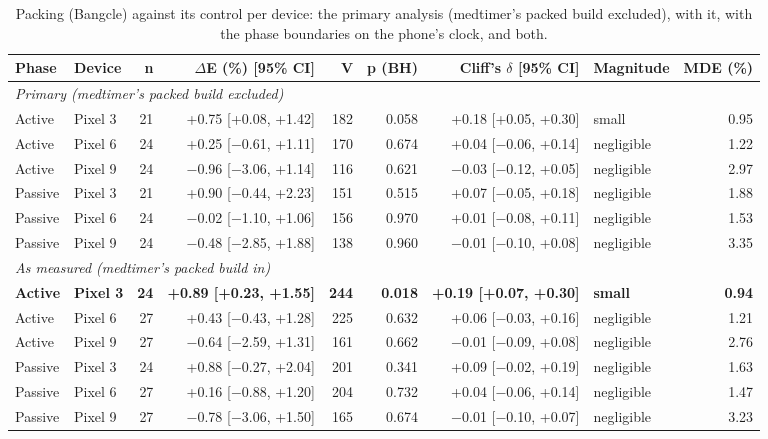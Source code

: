 \begin{table}[t]
\centering
\small
\caption{Packing (Bangcle) against its control per device: the primary analysis (medtimer's packed build excluded), with it, with the phase boundaries on the phone's clock, and both.}
\label{tab:packing-checks}
\begin{tabular}{llrrrrrlr}
\toprule
\textbf{Phase} & \textbf{Device} & \textbf{n} & \textbf{$\Delta$E (\%) [95\% CI]} & \textbf{V} & \textbf{p (BH)} & \textbf{Cliff's $\delta$ [95\% CI]} & \textbf{Magnitude} & \textbf{MDE (\%)} \\
\midrule
\multicolumn{9}{l}{\textit{Primary (medtimer's packed build excluded)}} \\
Active & Pixel 3 & 21 & +0.75 [+0.08, +1.42] & 182 & 0.058 & +0.18 [+0.05, +0.30] & small & 0.95 \\
Active & Pixel 6 & 24 & +0.25 [$-$0.61, +1.11] & 170 & 0.674 & +0.04 [$-$0.06, +0.14] & negligible & 1.22 \\
Active & Pixel 9 & 24 & $-$0.96 [$-$3.06, +1.14] & 116 & 0.621 & $-$0.03 [$-$0.12, +0.05] & negligible & 2.97 \\
Passive & Pixel 3 & 21 & +0.90 [$-$0.44, +2.23] & 151 & 0.515 & +0.07 [$-$0.05, +0.18] & negligible & 1.88 \\
Passive & Pixel 6 & 24 & $-$0.02 [$-$1.10, +1.06] & 156 & 0.970 & +0.01 [$-$0.08, +0.11] & negligible & 1.53 \\
Passive & Pixel 9 & 24 & $-$0.48 [$-$2.85, +1.88] & 138 & 0.960 & $-$0.01 [$-$0.10, +0.08] & negligible & 3.35 \\
\midrule
\multicolumn{9}{l}{\textit{As measured (medtimer's packed build in)}} \\
\textbf{Active} & \textbf{Pixel 3} & \textbf{24} & \textbf{+0.89 [+0.23, +1.55]} & \textbf{244} & \textbf{0.018} & \textbf{+0.19 [+0.07, +0.30]} & \textbf{small} & \textbf{0.94} \\
Active & Pixel 6 & 27 & +0.43 [$-$0.43, +1.28] & 225 & 0.632 & +0.06 [$-$0.03, +0.16] & negligible & 1.21 \\
Active & Pixel 9 & 27 & $-$0.64 [$-$2.59, +1.31] & 161 & 0.662 & $-$0.01 [$-$0.09, +0.08] & negligible & 2.76 \\
Passive & Pixel 3 & 24 & +0.88 [$-$0.27, +2.04] & 201 & 0.341 & +0.09 [$-$0.02, +0.19] & negligible & 1.63 \\
Passive & Pixel 6 & 27 & +0.16 [$-$0.88, +1.20] & 204 & 0.732 & +0.04 [$-$0.06, +0.14] & negligible & 1.47 \\
Passive & Pixel 9 & 27 & $-$0.78 [$-$3.06, +1.50] & 165 & 0.674 & $-$0.01 [$-$0.10, +0.07] & negligible & 3.23 \\

\end{tabular}
\end{table}
